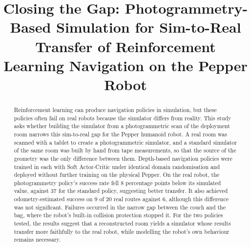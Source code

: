 \documentclass[conference]{IEEEtran}
\begin{document}
\title{Closing the Gap: Photogrammetry-Based Simulation for Sim-to-Real Transfer of
Reinforcement Learning Navigation on the Pepper Robot}

\author{
\and
{}
\and
{}
}

\maketitle

\begin{abstract}
Reinforcement learning can produce navigation policies in simulation, but these policies often fail
on real robots because the simulator differs from reality. This study asks whether building the
simulator from a photogrammetric scan of the deployment room narrows this sim-to-real gap for the
Pepper humanoid robot. A real room was scanned with a tablet to create a photogrammetric simulator,
and a standard simulator of the same room was built by hand from tape measurements, so that the
source of the geometry was the only difference between them. Depth-based navigation policies were
trained in each with Soft Actor-Critic under identical domain randomisation and deployed without
further training on the physical Pepper. On the real robot, the photogrammetry policy's success rate
fell 8 percentage points below its simulated value, against 37 for the standard policy, suggesting
better transfer. It also achieved odometry-estimated success on 9 of 20 real routes against 6,
although this difference was not significant. Failures occurred in the narrow gap between the couch
and the bag, where the robot's built-in collision protection stopped it. For the two policies
tested, the results suggest that a reconstructed room yields a simulator whose results transfer more
faithfully to the real robot, while modelling the robot's own behaviour remains necessary.
\end{abstract}
\end{document}
